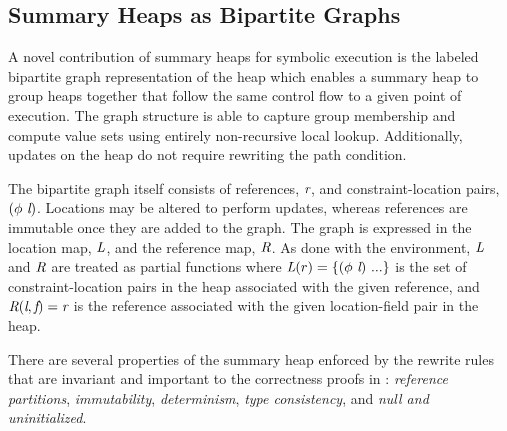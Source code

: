 \subsection{Summary Heaps as Bipartite Graphs}
A novel contribution of summary heaps for symbolic execution is the
labeled bipartite graph representation of the heap which enables a
summary heap to group heaps together that follow the same control flow
to a given point of execution. The graph structure is able to capture
group membership and compute value sets using entirely non-recursive
local lookup. Additionally, updates on the heap do not require
rewriting the path condition.

The bipartite graph itself consists of references, $\emph{r}$, and
constraint-location pairs, $(\phi\ \emph{l})$. Locations may be 
altered to perform updates, whereas references are immutable
once they are added to the graph. The graph is
expressed in the location map, $\emph{L}$, and the reference map,
$\emph{R}$. As done with the environment, $\emph{L}$ and $\emph{R}$
are treated as partial functions where $\emph{L}(r) =
\{(\phi\ \emph{l})\ ...\}$ is the set of constraint-location pairs in
the heap associated with the given reference, and
$\emph{R}(\emph{l},\emph{f}) = \emph{r}$ is the reference
associated with the given location-field pair in the heap.  

There are several properties of the summary heap enforced by the
rewrite rules that are invariant and important to the correctness
proofs in : \emph{reference partitions},
\emph{immutability}, \emph{determinism}, \emph{type
  consistency}, and \emph{null and uninitialized}.

